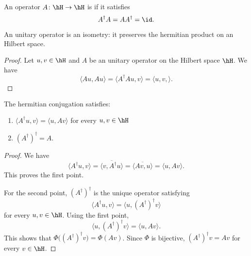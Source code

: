 \begin{definition}
    An operator \( A\colon \hH\to \hH\) is  if it satisfies
    \begin{equation}
        A^{\dag}A=AA^{\dag}=\id.
    \end{equation}
\end{definition}

\begin{lemma}
    An unitary operator is an isometry: it preserves the hermitian product on an Hilbert space.
\end{lemma}

\begin{proof}
    Let \( u,v\in \hH\) and \( A\) be an unitary operator on the Hilbert space \( \hH\). We have
    \begin{equation}
        \langle Au, Au\rangle =\langle A^{\dag}Au, v\rangle =\langle u,v, \rangle .
    \end{equation}
\end{proof}

\begin{lemma}
    The hermitian conjugation satisfies:
    \begin{enumerate}
        \item
            \( \langle A^{\dag}u, v\rangle =\langle u, Av\rangle \) for every \( u,v\in \hH\)
        \item
            \( (A^{\dag})^{\dag}=A\).
    \end{enumerate}
\end{lemma}

\begin{proof}
    We have
    \begin{equation}
        \langle A^{\dag}u, v\rangle =\overline{ \langle v, A^{\dag}u\rangle  }=\overline{ \langle Av, u\rangle  }=\langle u, Av\rangle .
    \end{equation}
    This proves the first point.

    For the second point, \( (A^{\dag})^{\dag}\) is the unique operator satisfying
    \begin{equation}
        \langle A^{\dag}u, v\rangle =\langle u, (A^{\dag})^{\dag}v\rangle 
    \end{equation}
    for every \( u,v\in \hH\). Using the first point,
    \begin{equation}
        \langle u, (A^{\dag})^{\dag} v\rangle =\langle u, Av\rangle .
    \end{equation}
    This shows that \( \Phi\big( (A^{\dag})^{\dag}v \big)=\Phi(Av)\). Since \( \Phi\) is bijective, \( (A^{\dag})^{\dag}v=Av\) for every \( v\in \hH\).
\end{proof}

